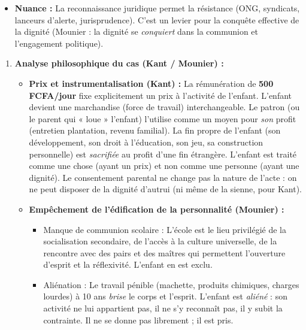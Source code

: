 \documentclass[11pt]{article}
\newcommand{\cle}[1]{{\popxbold\color{popdark}#1}}
\begin{document}
\begin{corrige}
\begin{enumerate}
\begin{itemize}
\begin{itemize}
            \item \textbf{Nuance :} La reconnaissance juridique permet la \cle{résistance} (ONG, syndicats, lanceurs d'alerte, jurisprudence). C'est un \cle{levier} pour la conquête effective de la dignité (Mounier : la dignité se \emph{conquiert} dans la communion et l'engagement politique).
        \end{itemize}
    \end{itemize}
\end{enumerate}
\end{corrige}

\begin{corrige}

\begin{enumerate}
    \item \textbf{Analyse philosophique du cas (Kant / Mounier) :}
    \begin{itemize}
        \item[a)] \textbf{Prix et instrumentalisation (Kant) :} La rémunération de \textbf{500 FCFA/jour} fixe explicitement un \cle{prix} à l'activité de l'enfant. L'enfant devient une \cle{marchandise} (force de travail) interchangeable. Le patron (ou le parent qui « loue » l'enfant) l'utilise comme un \cle{moyen} pour \emph{son} profit (entretien plantation, revenu familial). La \cle{fin propre} de l'enfant (son \cle{développement}, son \cle{droit à l'éducation}, son \cle{jeu}, sa \cle{construction personnelle}) est \emph{sacrifiée} au profit d'une fin étrangère. L'enfant est traité comme une \cle{chose} (ayant un prix) et non comme une \cle{personne} (ayant une dignité). Le consentement parental ne change pas la nature de l'acte : on ne peut disposer de la dignité d'autrui (ni même de la sienne, pour Kant).
        \item[b)] \textbf{Empêchement de l'édification de la personnalité (Mounier) :}
        \begin{itemize}
            \item \cle{Manque de communion scolaire :} L'école est le lieu privilégié de la \cle{socialisation secondaire}, de l'accès à la \cle{culture universelle}, de la rencontre avec des pairs et des maîtres qui permettent l'\cle{ouverture d'esprit} et la \cle{réflexivité}. L'enfant en est exclu.
            \item \cle{Aliénation :} Le travail pénible (machette, produits chimiques, charges lourdes) à 10 ans \emph{brise} le corps et l'esprit. L'enfant est \emph{aliéné} : son activité ne lui appartient pas, il ne s'y \cle{reconnaît} pas, il y subit la contrainte. Il ne \cle{se donne} pas librement ; il est \cle{pris}.

\end{itemize}
\end{itemize}
\end{enumerate}
\end{corrige}
\end{document}
